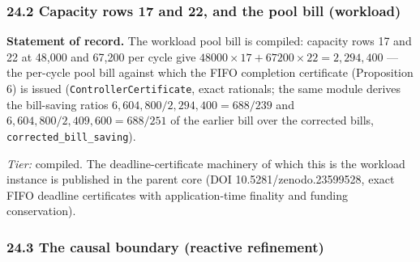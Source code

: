 \documentclass[
]{article}
\begin{document}
\subsubsection{24.2 Capacity rows 17 and 22, and the pool bill
(workload)}\label{capacity-rows-17-and-22-and-the-pool-bill-workload}

\textbf{Statement of record.} The workload pool bill is compiled:
capacity rows 17 and 22 at 48,000 and 67,200 per cycle give
\(48000 \times 17 + 67200 \times 22 = 2{,}294{,}400\) --- the per-cycle
pool bill against which the FIFO completion certificate (Proposition 6)
is issued
(\texttt{C\allowbreak{}o\allowbreak{}n\allowbreak{}t\allowbreak{}r\allowbreak{}o\allowbreak{}l\allowbreak{}l\allowbreak{}e\allowbreak{}r\allowbreak{}C\allowbreak{}e\allowbreak{}r\allowbreak{}t\allowbreak{}i\allowbreak{}f\allowbreak{}i\allowbreak{}c\allowbreak{}a\allowbreak{}t\allowbreak{}e},
exact rationals; the same module derives the bill-saving ratios
\(6{,}604{,}800/2{,}294{,}400 = 688/239\) and
\(6{,}604{,}800/2{,}409{,}600 = 688/251\) of the earlier bill over the
corrected bills,
\texttt{c\allowbreak{}o\allowbreak{}r\allowbreak{}r\allowbreak{}e\allowbreak{}c\allowbreak{}t\allowbreak{}e\allowbreak{}d\allowbreak{}\_\allowbreak{}b\allowbreak{}i\allowbreak{}l\allowbreak{}l\allowbreak{}\_\allowbreak{}s\allowbreak{}a\allowbreak{}v\allowbreak{}i\allowbreak{}n\allowbreak{}g}).

\emph{Tier:} compiled. The deadline-certificate machinery of which this
is the workload instance is published in the parent core (DOI
1\allowbreak{}0\allowbreak{}.\allowbreak{}5\allowbreak{}2\allowbreak{}8\allowbreak{}1\allowbreak{}/\allowbreak{}z\allowbreak{}e\allowbreak{}n\allowbreak{}o\allowbreak{}d\allowbreak{}o\allowbreak{}.\allowbreak{}2\allowbreak{}3\allowbreak{}5\allowbreak{}9\allowbreak{}9\allowbreak{}5\allowbreak{}2\allowbreak{}8\allowbreak{},
exact FIFO deadline certificates with application-time finality and
funding conservation).

\subsubsection{24.3 The causal boundary (reactive
refinement)}\label{the-causal-boundary-reactive-refinement}
\end{document}
